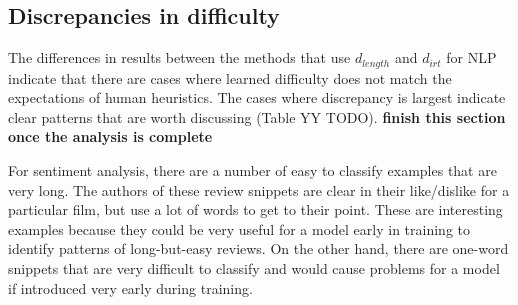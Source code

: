 \documentclass[letterpaper]{article} %
\begin{document}
\begin{comment}  
\begin{table*}[h!]
	\centering 
	\small 
	\begin{tabular}{cccc}
		\toprule
		Data Set & Experiment & Mean & Variance \\ 
		\midrule
		MNIST & Baseline & 99.24&	0.0003
		\\
		\cmidrule{2-4}
		& EasyFirst & 99.17&	0.0004
		\\
		& MiddleOut & 99.13&	0.0005
		\\
		& Theta& 99.23&	 0.0003
		\\
		\midrule
		CIFAR & Baseline & 85.85 &	0.412
		\\
		\cmidrule{2-4}
		& EasyFirst & 85.53	&0.181
		\\
		& MiddleOut & 85.31&0.301
		\\
		& Theta &83.84& 0.278
		\\
		\midrule
		SSTB & Baseline &  &	0
		\\
		\cmidrule{2-4}
		& EasyFirst & &	-0.39
		\\
		& MiddleOut & &	-0.06
		\\
		& Ordered & &	 1.41
		\\
		& Theta &&	-0.46
		\\
		\midrule
		SNLI & Baseline & &	0
		\\
		\cmidrule{2-4}
		& EasyFirst & & 	-0.56
		\\
		& MiddleOut &&	-3.55
		\\
		& Ordered & &	-84.81
		\\
		& Theta& &	-0.95
		\\
		\bottomrule 
	\end{tabular}
	\label{tab:robustness}
\end{table*}
\end{comment} 

\subsection{Discrepancies in difficulty}
The differences in results between the methods that use $d_{length}$ and $d_{irt}$ for NLP indicate that there are cases where learned difficulty does not match the expectations of human heuristics.
The cases where discrepancy is largest indicate clear patterns that are worth discussing (Table YY TODO).
\textbf{finish this section once the analysis is complete} 

For sentiment analysis, there are a number of easy to classify examples that are very long.
The authors of these review snippets are clear in their like/dislike for a particular film, but use a lot of words to get to their point.
These are interesting examples because they could be very useful for a model early in training to identify patterns of long-but-easy reviews.
On the other hand, there are one-word snippets that are very difficult to classify and would cause problems for a model if introduced very early during training.
\end{document}
